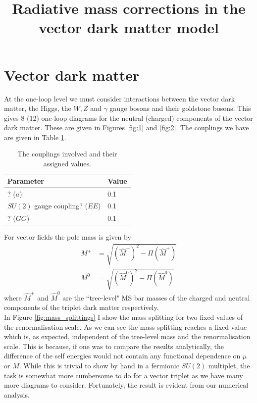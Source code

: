 \documentclass[11pt]{article}
\begin{document}
\title{Radiative mass corrections in the vector dark matter model}
\maketitle
\section{Vector dark matter}

At the one-loop level we must consider interactions between the vector dark matter, the Higgs, the $W,Z$ and $\gamma$ gauge bosons and their goldstone bosons.  This gives 8 (12) one-loop diagrams for the neutral (charged) components of the vector dark matter.  These are given in Figures \ref{fig:1} and \ref{fig:2}.  The couplings we have are given in Table \ref{table:output_params}.

\begin{table}[h!]
\caption{The couplings involved and their assigned values.}\label{table:output_params}
\centering
\vspace{0.5cm}
\begin{tabular}{l l}
\hline
Parameter & Value \\
\hline
? ($a$) & 0.1\\
$SU(2)$ gauge coupling? ($EE$) & 0.1\\
? ($GG$) & 0.1 \\
\hline\end{tabular}
\end{table}

For vector fields the pole mass is given by
\begin{align}
M^+&=\sqrt{(\hat{M}^+)^2-\Pi(\hat{M}^+)}\\
M^0&=\sqrt{(\hat{M}^0)^2-\Pi(\hat{M}^0)}
\end{align}
where $\hat{M}^+$ and $\hat{M}^0$ are the ``tree-level" MS bar masses of the charged and neutral components of the triplet dark matter respectively.\\

In Figure \ref{fig:mass_splittings} I show the mass splitting for two fixed values of the renormalisation scale.  As we can see the mass splitting reaches a fixed value which is, as expected, independent of the tree-level mass and the renormalisation scale.  This is because, if one was to compare the results analytically, the difference of the self energies would not contain any functional dependence on $\mu$ or $M$.  While this is trivial to show by hand in a fermionic $SU(2)$ multiplet, the task is somewhat more cumbersome to do for a vector triplet as we have many more diagrams to consider.  Fortunately, the result is evident from our numerical analysis.
\end{document}
